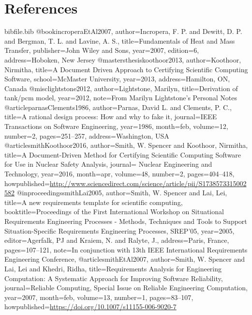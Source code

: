 \documentclass[12pt]{article}
\begin{document}
\section{References}
\label{Sec:References}
\begin{filecontents*}{bibfile.bib}
@book{incroperaEtAl2007,
author={Incropera, F. P. and Dewitt, D. P. and Bergman, T. L. and Lavine, A. S.},
title={Fundamentals of Heat and Mass Transfer},
publisher={John Wiley and Sons},
year={2007},
edition={6},
address={Hoboken, New Jersey}}
@mastersthesis{koothoor2013,
author={Koothoor, Nirmitha},
title={A Document Driven Approach to Certifying Scientific Computing Software},
school={McMaster University},
year={2013},
address={Hamilton, ON, Canada}}
@misc{lightstone2012,
author={Lightstone, Marilyn},
title={Derivation of tank/pcm model},
year={2012},
note={From Marilyn Lightstone's Personal Notes}}
@article{parnasClements1986,
author={Parnas, David L. and Clements, P. C.},
title={A rational design process: How and why to fake it},
journal={IEEE Transactions on Software Engineering},
year={1986},
month=feb,
volume={12},
number={2},
pages={251--257},
address={Washington, USA}}
@article{smithKoothoor2016,
author={Smith, W. Spencer and Koothoor, Nirmitha},
title={A Document-Driven Method for Certifying Scientific Computing Software for Use in Nuclear Safety Analysis},
journal={ Nuclear Engineering and Technology},
year={2016},
month=apr,
volume={48},
number={2},
pages={404--418},
howpublished={\url{http://www.sciencedirect.com/science/article/pii/S1738573315002582}}}
@inproceedings{smithLai2005,
author={Smith, W. Spencer and Lai, Lei},
title={A new requirements template for scientific computing},
booktitle={Proceedings of the First International Workshop on Situational Requirements Engineering Processes - Methods, Techniques and Tools to Support Situation-Specific Requirements Engineering Processes, SREP'05},
year={2005},
editor={Agerfalk, PJ and Kraiem, N. and Ralyte, J.},
address={Paris, France},
pages={107--121},
note={In conjunction with 13th IEEE International Requirements Engineering Conference,}}
@article{smithEtAl2007,
author={Smith, W. Spencer and Lai, Lei and Khedri, Ridha},
title={Requirements Analysis for Engineering Computation: A Systematic Approach for Improving Software Reliability},
journal={Reliable Computing, Special Issue on Reliable Engineering Computation},
year={2007},
month=feb,
volume={13},
number={1},
pages={83--107},
howpublished={\url{https://doi.org/10.1007/s11155-006-9020-7}}}
\end{filecontents*}
\nocite{*}
\printbibliography[heading=none]
\end{document}
